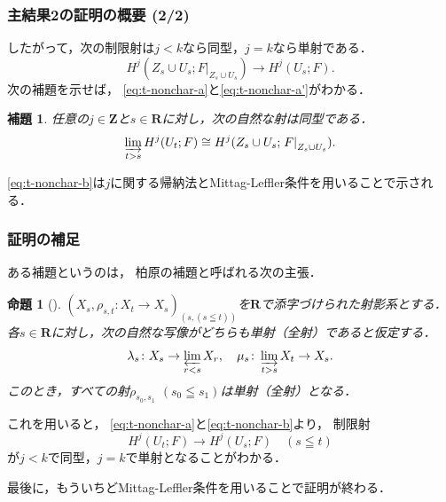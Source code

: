\documentclass[dvipdfmx,10pt,aspectratio=169,leqno]{beamer}%
\newcommand{\zz}{\mathbf{Z}}
\newcommand{\rr}{\mathbf{R}}
\numberwithin{equation}{subsection}
\newcommand{\indlim}[1][]{\mathop{\varinjlim}\limits_{#1}}
\newcommand{\prolim}[1][]{\mathop{\varprojlim}\limits_{#1}}
\newcommand{\mres}[2][]{{\left.{#1}\right\rvert}_{#2}}
\theoremstyle{mystyle}
\newtheorem{PRP}[AXM]{命題}
\newtheorem{LMM}[AXM]{補題}
\begin{document}
\begin{frame}
  \frametitle{主結果2の証明の概要 (2/2)}
  したがって，次の制限射は\(j<k\)なら同型，\(j=k\)なら単射である．
  \[
    H^{j}(Z_{s}\cup U_{s};\mres[F]{Z_{s}\cup U_{s}})
    \to
    H^{j}(U_{s};F).
  \]
  次の補題を示せば，
  \ref{eq:t-nonchar-a}と\ref{eq:t-nonchar-a'}がわかる．
  \begin{LMM}%
    任意の\(j\in\zz\)と\(s\in\rr\)に対し，次の自然な射は同型である．
    \[
      \indlim[t>s]H^{j}(U_t;F)
      \cong 
      H^{j}(Z_{s}\cup U_{s};\mres[F]{Z_{s}\cup U_{s}}).
    \]
  \end{LMM}
  \ref{eq:t-nonchar-b}は\(j\)に関する帰納法とMittag-Leffler条件を用いることで示される．
\end{frame}
\begin{frame}
  \frametitle{証明の補足}

  ある補題\cite[Proposition 1.12.6]{KS90}というのは，
  柏原の補題と呼ばれる次の主張．
  \begin{PRP}[{\cite[Proposition 1.12.6]{KS90}}]
    \(
      \left(X_s,\rho_{s,t}\colon X_t\to X_s\right)_{(s,(s\leqq t))}
    \)を\(\rr\)で添字づけられた射影系とする．
    各\(s\in\rr\)に対し，次の自然な写像がどちらも単射（全射）であると仮定する．
    \[
      \lambda_s\colon X_s\to\prolim[r<s]X_r
      ,\quad
      \mu_s\colon \indlim[t>s]X_t\to X_s.
    \]
    このとき，すべての射\(
      \rho_{s_{0},s_{1}}\) \((s_0\leqq s_1)
    \)は単射（全射）となる．
  \end{PRP}
  これを用いると，
  \ref{eq:t-nonchar-a}と\ref{eq:t-nonchar-b}より，
  制限射
  \[
    H^{j}\left(U_{t};F\right)
    \to
    H^{j}\left(U_{s};F\right)\quad  (s\leqq t)
  \]
  が\(j<k\)で同型，\(j=k\)で単射となることがわかる．

  最後に，もういちどMittag-Leffler条件を用いることで証明が終わる．
\end{frame}
\end{document}
